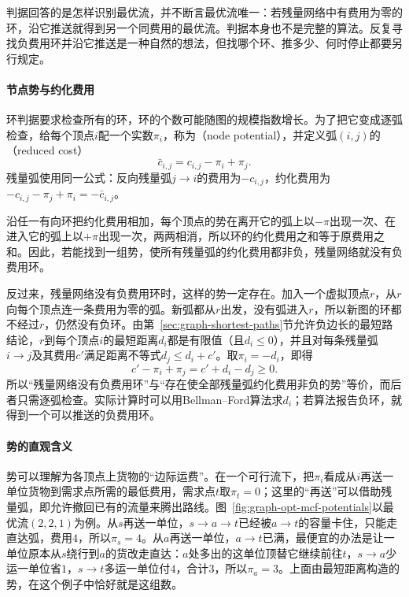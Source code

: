 判据回答的是怎样识别最优流，并不断言最优流唯一：若残量网络中有费用为零的环，沿它推送就得到另一个同费用的最优流。判据本身也不是完整的算法。反复寻找负费用环并沿它推送是一种自然的想法，但找哪个环、推多少、何时停止都要另行规定。

\paragraph{节点势与约化费用}
环判据要求检查所有的环，环的个数可能随图的规模指数增长。为了把它变成逐弧检查，给每个顶点$i$配一个实数$\pi_i$，称为（node potential），并定义弧$(i,j)$的（reduced cost）
\begin{equation}
  \bar c_{i,j}=c_{i,j}-\pi_i+\pi_j.
  \label{eq:graph-opt-reduced-cost}
\end{equation}
残量弧使用同一公式：反向残量弧$j\to i$的费用为$-c_{i,j}$，约化费用为$-c_{i,j}-\pi_j+\pi_i=-\bar c_{i,j}$。

沿任一有向环把约化费用相加，每个顶点的势在离开它的弧上以$-\pi$出现一次、在进入它的弧上以$+\pi$出现一次，两两相消，所以环的约化费用之和等于原费用之和。因此，若能找到一组势，使所有残量弧的约化费用都非负，残量网络就没有负费用环。

反过来，残量网络没有负费用环时，这样的势一定存在。加入一个虚拟顶点$r$，从$r$向每个顶点连一条费用为零的弧。新弧都从$r$出发，没有弧进入$r$，所以新图的环都不经过$r$，仍然没有负环。由第~\ref{sec:graph-shortest-paths}节允许负边长的最短路结论，$r$到每个顶点$i$的最短距离$d_i$都是有限值（且$d_i\leq0$），并且对每条残量弧$i\to j$及其费用$c'$满足距离不等式$d_j\leq d_i+c'$。取$\pi_i=-d_i$，即得
\[
  c'-\pi_i+\pi_j=c'+d_i-d_j\geq0.
\]
所以“残量网络没有负费用环”与“存在使全部残量弧约化费用非负的势”等价，而后者只需逐弧检查。实际计算时可以用Bellman--Ford算法求$d_i$；若算法报告负环，就得到一个可以推送的负费用环。

\paragraph{势的直观含义}
势可以理解为各顶点上货物的“边际运费”。在一个可行流下，把$\pi_i$看成从$i$再送一单位货物到需求点所需的最低费用，需求点$t$取$\pi_t=0$；这里的“再送”可以借助残量弧，即允许撤回已有的流量来腾出路线。图~\ref{fig:graph-opt-mcf-potentials}以最优流$(2,2,1)$为例。从$s$再送一单位，$s\to a\to t$已经被$a\to t$的容量卡住，只能走直达弧，费用$4$，所以$\pi_s=4$。从$a$再送一单位，$a\to t$已满，最便宜的办法是让一单位原本从$s$绕行到$a$的货改走直达：$a$处多出的这单位顶替它继续前往$t$，$s\to a$少运一单位省$1$，$s\to t$多运一单位付$4$，合计$3$，所以$\pi_a=3$。上面由最短距离构造的势，在这个例子中恰好就是这组数。

